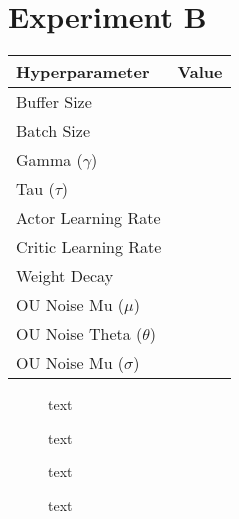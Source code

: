 \section{Experiment B}

\begin{minipage}{0.45\textwidth}
	\centering
	\begin{tabular}{lr}
	\toprule
	\textbf{Hyperparameter} & \textbf{Value} \\
	\midrule
	Buffer Size & \\
	Batch Size & \\
	Gamma ($\gamma$) & \\
	Tau ($\tau$) & \\
	Actor Learning Rate & \\
	Critic Learning Rate & \\
	Weight Decay & \\
	OU Noise Mu ($\mu$) & \\
	OU Noise Theta ($\theta$) & \\
	OU Noise Mu ($\sigma$) & \\
	\bottomrule
	\end{tabular}
\end{minipage}
\hspace{1cm}
\begin{minipage}{0.45\textwidth}
	\centering
\end{minipage}

\begin{figure}[h]
	\begin{minipage}{0.45\textwidth}
		\centering
		
		\caption{text}
		\label{fig:5201_raw_reward_plot}
	\end{minipage}
	\hspace{0.75cm}
	\begin{minipage}{0.45\textwidth}
		\centering
		
		\caption{text}
		\label{fig:5202_average_reward_plot}
	\end{minipage}
\end{figure}

\begin{figure}[h]
	\begin{minipage}{0.45\textwidth}
		\centering
		
		\caption{text}
		\label{fig:5203_frequency_response_1}
	\end{minipage}
	\hspace{0.75cm}
	\begin{minipage}{0.45\textwidth}
		\centering
		
		\caption{text}
		\label{fig:5204_frequency_response_2}
	\end{minipage}
\end{figure}

